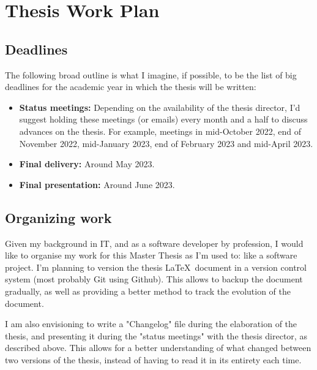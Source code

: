 \chapter{Thesis Work Plan}

\section{Deadlines}
\label{sec:deadlines}

The following broad outline is what I imagine, if possible, to be the list of big
deadlines for the academic year in which the thesis will be written:

\begin{itemize}
    \vspace{-0.4cm}
    \item \textbf{Status meetings:} Depending on the availability of the thesis director,
    I'd suggest holding these meetings (or emails) every month and a half to discuss advances
    on the thesis. For example, meetings in mid-October 2022, end of November 2022, mid-January 2023,
    end of February 2023 and mid-April 2023.
    \item \textbf{Final delivery:} Around May 2023.
    \item \textbf{Final presentation:} Around June 2023.
\end{itemize}

\vspace{-0.8cm}

\section{Organizing work}
\label{sec:organizing_work}

Given my background in IT, and as a software developer by profession, I would like
to organise my work for this Master Thesis as I'm used to: like a software project.
I'm planning to version the thesis \LaTeX \ document in a version control system
(most probably Git using Github). This allows to backup the document gradually,
as well as providing a better method to track the evolution of the document.\newline

I am also envisioning to write a "Changelog" file during the elaboration of the
thesis, and presenting it during the "status meetings" with the thesis director, as described above.
This allows for a better understanding of what changed between two versions of the thesis,
instead of having to read it in its entirety each time.
